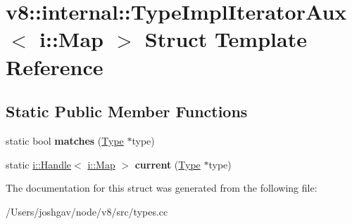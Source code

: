 \hypertarget{structv8_1_1internal_1_1_type_impl_iterator_aux_3_01i_1_1_map_01_4}{}\section{v8\+:\+:internal\+:\+:Type\+Impl\+Iterator\+Aux$<$ i\+:\+:Map $>$ Struct Template Reference}
\label{structv8_1_1internal_1_1_type_impl_iterator_aux_3_01i_1_1_map_01_4}
\subsection*{Static Public Member Functions}
\begin{DoxyCompactItemize}
\item 
static bool {\bfseries matches} (\hyperlink{classv8_1_1internal_1_1_type}{Type} $\ast$type)\hypertarget{structv8_1_1internal_1_1_type_impl_iterator_aux_3_01i_1_1_map_01_4_a19f0f8992993a36698f5d23a3a53e03e}{}\label{structv8_1_1internal_1_1_type_impl_iterator_aux_3_01i_1_1_map_01_4_a19f0f8992993a36698f5d23a3a53e03e}

\item 
static \hyperlink{classv8_1_1internal_1_1_handle}{i\+::\+Handle}$<$ \hyperlink{classv8_1_1internal_1_1_map}{i\+::\+Map} $>$ {\bfseries current} (\hyperlink{classv8_1_1internal_1_1_type}{Type} $\ast$type)\hypertarget{structv8_1_1internal_1_1_type_impl_iterator_aux_3_01i_1_1_map_01_4_a2930b09b26d2376a30f673a220b0f958}{}\label{structv8_1_1internal_1_1_type_impl_iterator_aux_3_01i_1_1_map_01_4_a2930b09b26d2376a30f673a220b0f958}

\end{DoxyCompactItemize}


The documentation for this struct was generated from the following file\+:\begin{DoxyCompactItemize}
\item 
/\+Users/joshgav/node/v8/src/types.\+cc\end{DoxyCompactItemize}
